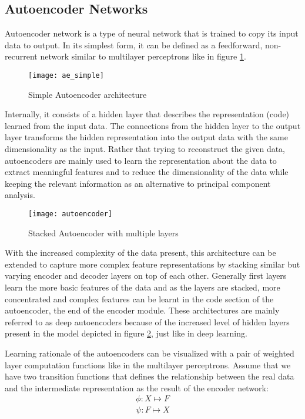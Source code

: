 \subsection{Autoencoder Networks}
\label{sec:ae}
 
Autoencoder network is a type of neural network that is trained to copy its input data to output.
\cite{Goodfellow-et-al-2016} In its simplest form, it can be defined as a feedforward, non-
recurrent network similar to multilayer perceptrons like in figure \ref{fig:ae_simple}.
\begin{figure}[h!]
	\centering
	\texttt{[image: ae\_simple]}
    \caption{Simple Autoencoder architecture}
    \label{fig:ae_simple}
\end{figure}

Internally, it consists of a hidden layer that describes the representation (code) learned from the
input data. The connections from the hidden layer to the output layer transforms the hidden
representation into the output data with the same dimensionality as the input. Rather that trying to
reconstruct the given data, autoencoders are mainly used to learn the representation about the data
to extract meaningful features and to reduce the dimensionality of the data while keeping the
relevant information as an alternative to principal component analysis. 

\begin{figure}[h!]
	\centering
	\texttt{[image: autoencoder]}
    \caption{Stacked Autoencoder with multiple layers}
    \label{fig:ae_deep}
\end{figure}

With the increased complexity of the data present, this architecture can be extended to capture more
complex feature representations by stacking similar but varying encoder and decoder layers on top of
each other. Generally first layers learn the more basic features of the data and as the layers are
stacked, more concentrated and complex features can be learnt in the code section of the
autoencoder, the end of the encoder module. These architectures are mainly referred to as deep
autoencoders because of the increased level of hidden layers present in the model depicted in figure
\ref{fig:ae_deep}, just like in deep learning.

Learning rationale of the autoencoders can be visualized with a pair of weighted layer computation
functions like in the multilayer perceptrons. Assume that we have two transition functions that
defines the relationship between the real data and the intermediate representation as the result of
the encoder network:
\begin{align*}
    \phi : X \mapsto F \\
    \psi : F \mapsto X     
\end{align*}

